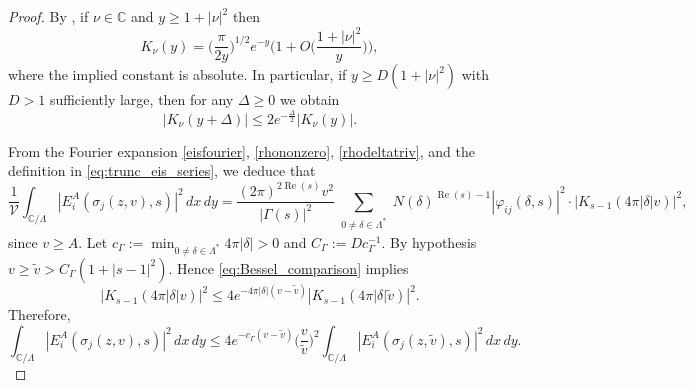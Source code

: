\documentclass[12pt,reqno]{amsart}
\numberwithin{equation}{section}
\renewcommand{\Re}{\operatorname{Re}}
\newcommand{\C}{\mathbb{C}}
\begin{document}
\begin{proof}
    By \cite[\S10.40(iii)]{DLMF}, if $\nu \in \C$ and $y \geq 1 + |{\nu}|^2$ then 
    \begin{equation}\label{eq:Bessel_bound}
        K_\nu(y) = \Big(\frac{\pi}{2y}\Big)^{1/2} e^{-y} \Big( 1 + O\Big(\frac{1 + |{\nu}|^2}{y}\Big)\Big),
    \end{equation}
    where the implied constant is absolute. In particular, if $y \geq D(1 + |{\nu}|^2)$ with $D>1$ sufficiently large, then for any $\Delta \geq 0$ we obtain
    \begin{equation}\label{eq:Bessel_comparison}
        |K_\nu(y+\Delta)| \leq 2 e^{-\frac{\Delta}{2}} |K_{\nu}(y)|.
    \end{equation}

    From the Fourier expansion \eqref{eisfourier}, \eqref{rhononzero}, \eqref{rhodeltatriv}, and the definition in \eqref{eq:trunc_eis_series}, we deduce that
    \begin{equation*}
        \frac{1}{\mathcal{V}} \int_{\C / \Lambda} |{E_i^A(\sigma_j (z, v), s)}|^2 \, dx \, dy  = \frac{(2 \pi)^{2\Re(s)} v^2}{|\Gamma(s)|^2}  \sum_{\substack{0 \neq \delta \in \Lambda^* }} N(\delta)^{\Re(s)-1} |{\varphi_{i j}(\delta,s)}|^2  \cdot |{K_{s-1}(4 \pi |{\delta}|v)}|^2,
    \end{equation*}
     since $v \geq A$. Let $\displaystyle c_\Gamma := \min_{0 \neq \delta \in \Lambda^*} 4\pi|{\delta}| > 0$ and $C_{\Gamma}:=D c^{-1}_{\Gamma}$.
    By hypothesis $v \geq \widetilde{v} > C_{\Gamma}(1 + |{s-1}|^2)$. Hence \eqref{eq:Bessel_comparison} implies
    \begin{equation*}
        |{K_{s-1}(4 \pi |{\delta}|v)}|^2 \leq 4 e^{-4\pi |{\delta }|(v - \widetilde{v})} |{K_{s-1}(4 \pi |{\delta}|\widetilde{v})}|^2.
    \end{equation*} 
    Therefore, 
    \begin{equation}\label{eq:exp_gain}
        \int_{\C / \Lambda} |{E_i^A(\sigma_j (z, v), s)}|^2 \, dx \, dy \leq 4 e^{-c_\Gamma (v-\widetilde{v})} \Big( \frac{v}{\widetilde{v}} \Big)^2 \int_{\C / \Lambda} |{E_i^A(\sigma_j (z, \widetilde{v}), s)}|^2 \, dx \, dy.
    \end{equation}


\end{proof}
\end{document}
